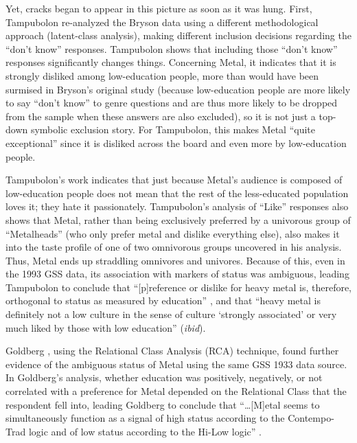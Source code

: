 \documentclass[a4paper,12pt]{extarticle}
\begin{document}
Yet, cracks began to appear in this picture as soon as it was hung. First, Tampubolon \citeyearpar{tampubolon2008revisiting} re-analyzed the Bryson data using a different methodological approach (latent-class analysis), making different inclusion decisions regarding the ``don't know'' responses. Tampubolon shows that including those ``don't know'' responses significantly changes things. Concerning Metal, it indicates that it is strongly disliked among low-education people, more than would have been surmised in Bryson's original study (because low-education people are more likely to say ``don't know'' to genre questions and are thus more likely to be dropped from the sample when these answers are also excluded), so it is not just a top-down symbolic exclusion story. For Tampubolon, this makes Metal ``quite exceptional'' since it is disliked across the board and even more by low-education people. 

Tampubolon's work indicates that just because Metal's audience is composed of low-education people does not mean that the rest of the less-educated population loves it; they hate it passionately. Tampubolon's analysis of ``Like'' responses also shows that Metal, rather than being exclusively preferred by a univorous group of ``Metalheads'' (who only prefer metal and dislike everything else), also makes it into the taste profile of one of two omnivorous groups uncovered in his analysis. Thus, Metal ends up straddling omnivores and univores. Because of this, even in the 1993 GSS data, its association with markers of status was ambiguous, leading Tampubolon to conclude that ``[p]reference or dislike for heavy metal is, therefore, orthogonal to status as measured by education'' \citeyearpar[][257]{tampubolon2008revisiting}, and that ``heavy metal is definitely not a low culture in the sense of culture `strongly associated' or very much liked by those with low education'' (\textit{ibid}). 

Goldberg \citeyearpar{goldberg2011mapping}, using the Relational Class Analysis (RCA) technique, found further evidence of the ambiguous status of Metal using the same GSS 1933 data source. In Goldberg's analysis, whether education was positively, negatively, or not correlated with a preference for Metal depended on the Relational Class that the respondent fell into, leading Goldberg to conclude that ``\ldots [M]etal seems to simultaneously function as  a  signal  of  high  status according  to  the Contempo-Trad logic and of low status according to the Hi-Low logic'' \citeyearpar[][1421]{goldberg2011mapping}.
\end{document}
